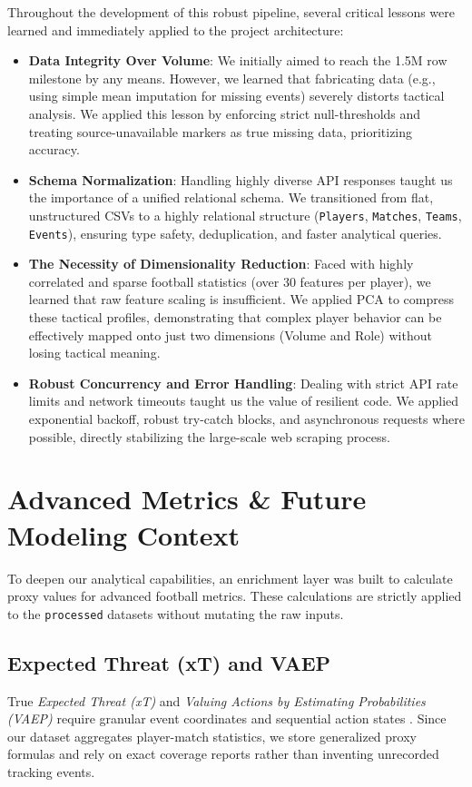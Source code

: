 \documentclass[12pt,a4paper]{article}
\begin{document}
Throughout the development of this robust pipeline, several critical lessons were learned and immediately applied to the project architecture:
\begin{itemize}
    \item \textbf{Data Integrity Over Volume}: We initially aimed to reach the 1.5M row milestone by any means. However, we learned that fabricating data (e.g., using simple mean imputation for missing events) severely distorts tactical analysis. We applied this lesson by enforcing strict null-thresholds and treating source-unavailable markers as true missing data, prioritizing accuracy.
    \item \textbf{Schema Normalization}: Handling highly diverse API responses taught us the importance of a unified relational schema. We transitioned from flat, unstructured CSVs to a highly relational structure (\texttt{Players}, \texttt{Matches}, \texttt{Teams}, \texttt{Events}), ensuring type safety, deduplication, and faster analytical queries.
    \item \textbf{The Necessity of Dimensionality Reduction}: Faced with highly correlated and sparse football statistics (over 30 features per player), we learned that raw feature scaling is insufficient. We applied PCA to compress these tactical profiles, demonstrating that complex player behavior can be effectively mapped onto just two dimensions (Volume and Role) without losing tactical meaning.
    \item \textbf{Robust Concurrency and Error Handling}: Dealing with strict API rate limits and network timeouts taught us the value of resilient code. We applied exponential backoff, robust try-catch blocks, and asynchronous requests where possible, directly stabilizing the large-scale web scraping process.
\end{itemize}

\section{Advanced Metrics \& Future Modeling Context}

To deepen our analytical capabilities, an enrichment layer was built to calculate proxy values for advanced football metrics. These calculations are strictly applied to the \texttt{processed} datasets without mutating the raw inputs.

\subsection{Expected Threat (xT) and VAEP}
True \textit{Expected Threat (xT)} and \textit{Valuing Actions by Estimating Probabilities (VAEP)} require granular event coordinates and sequential action states \cite{decroos, soccermatics_xt}. Since our dataset aggregates player-match statistics, we store generalized proxy formulas and rely on exact coverage reports rather than inventing unrecorded tracking events.
\end{document}
